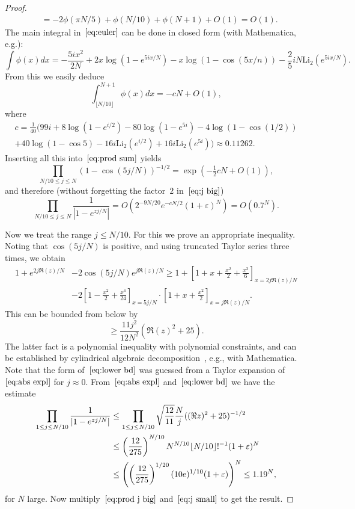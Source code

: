 \documentclass[a4paper]{amsart}
\begin{document}
\begin{proof}
\begin{align*}
    &= -2\phi(\pi N/5)+\phi(N/10)+\phi(N+1)+O(1) = O(1).
  \end{align*}
  The main integral in~$\ref{eq:euler}$ can be done in closed form
  (with Mathematica, e.g.):
  \[
    \int \phi(x) dx = -\frac{5i x^2}{2N} + 2x \log(1-e^{5ix/N})
    - x \log(1-\cos(5x/n)) - \frac25 i N \mathrm{Li}_2(e^{5ix/N}).
  \]
  From this we easily deduce
  \[
     \int_{\lfloor N/10 \rfloor}^{N+1} \phi(x)dx = -c N + O(1),
  \]
  where
  \begin{multline*}
    c = \frac{1}{40}(99 i +8\log(1-e^{i/2}) -80 \log(1-e^{5i})
    -4\log(1-\cos(1/2)) \\
     + 40 \log(1-\cos 5)     -16i \mathrm{Li}_2(e^{i/2})
    +16i \mathrm{Li}_2(e^{5i})) \approx 0.11262.
  \end{multline*}
  Inserting all this into~$\ref{eq:prod sum}$ yields
  \[
    \prod_{N/10 \leq j\leq N}(1-\cos(5j/N))^{-1/2} = \exp(-\tfrac12 cN + O(1)),
  \]
  and therefore (without forgetting the factor~$2$ in~$\ref{eq:j big}$)
  \begin{equation}\label{eq:prod j big}
    \prod_{N/10 \leq j\leq N} \frac{1}{|1-e^{z j/N}|} = O(2^{-9N/20} e^{-cN/2}
    (1+\varepsilon)^N ) = O(0.7^N).
  \end{equation}
  
  Now we treat the range $j\leq N/10$. For this we prove an appropriate
  inequality. Noting that $\cos(5j/N)$ is positive, and using truncated
  Taylor series three times, we obtain
  \begin{align*}
    1+  e^{2j \Re(z)/N}& - 2\cos(5j/N)  e^{j \Re(z)/N} 
    \geq 1+\left[1+x+\frac{x^2}{2}+\frac{x^3}{6} \right]_{x=2j \Re(z)/N} \\
    &- 2\left[1-\frac{x^2}{2}+\frac{x^4}{24} \right]_{x=5j/N} \cdot
    \left[1+x+\frac{x^2}{2} \right]_{x=j \Re(z)/N}.
  \end{align*}
  This can be bounded from below by
  \begin{equation}\label{eq:lower bd}
    \geq \frac{11j^2}{12N^2}(\Re(z)^2+25).
  \end{equation}
  The latter fact is a polynomial inequality with polynomial constraints,
  and can be established by cylindrical algebraic
  decomposition~\cite{Co75}, e.g., with Mathematica.
  Note that the form of~$\ref{eq:lower bd}$ was guessed from a Taylor expansion
  of~$\ref{eq:abs expl}$
  for $j\approx 0$. From~$\ref{eq:abs expl}$
  and~$\ref{eq:lower bd}$ we have the estimate
  \begin{align}
    \prod_{1\leq j\leq N/10} \frac{1}{|1-e^{z j/N}|} &\leq \prod_{1\leq j\leq N/10}
      \sqrt{\frac{12}{11}} \frac{N}{j} ((\Re z)^2 +25)^{-1/2} \notag \\
    &\leq \left( \frac{12}{275} \right)^{N/10} N^{N/10} \lfloor N/10 \rfloor!^{-1}(1+\varepsilon)^N  \notag \\
    & \leq \left(
     \left(\frac{12}{275}\right)^{1/20}(10e)^{1/10}(1+\varepsilon)\right)^N
    \leq 1.19^N, \label{eq:j small}
  \end{align}
  for $N$ large.
  Now multiply~$\ref{eq:prod j big}$ and~$\ref{eq:j small}$ to
  get the result.
\end{proof}
\end{document}
